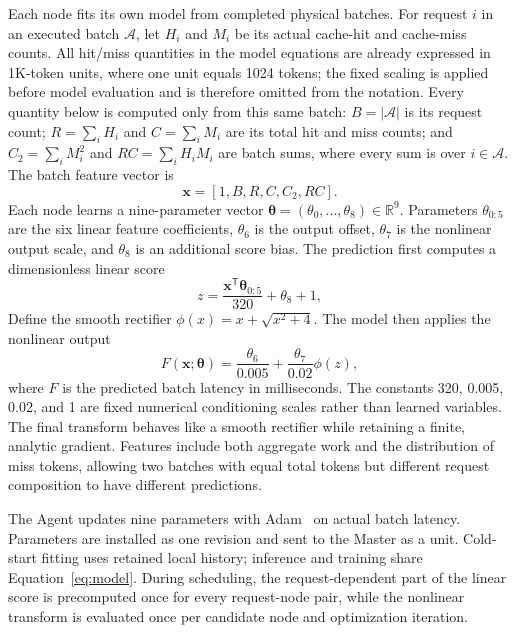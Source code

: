 \documentclass[10pt]{article}
\begin{document}
Each node fits its own model from completed physical batches. For request $i$
in an executed batch $\mathcal{A}$, let $H_i$ and $M_i$ be its actual cache-hit
and cache-miss counts. All hit/miss quantities in the model equations are
already expressed in 1K-token units, where one unit equals 1024 tokens; the
fixed scaling is applied before model evaluation and is therefore omitted
from the notation. Every quantity below is computed only from this same batch:
$B=|\mathcal{A}|$ is its request count; $R=\sum_iH_i$ and $C=\sum_iM_i$ are
its total hit and miss counts; and $C_2=\sum_iM_i^2$ and
$RC=\sum_iH_iM_i$ are batch sums, where every sum is over
$i\in\mathcal{A}$. The batch feature vector is
\begin{equation}
\mathbf{x}=
\left[1, B, R, C, C_2, RC\right].
\label{eq:features}
\end{equation}
Each node learns a nine-parameter vector
$\boldsymbol{\theta}=(\theta_0,\ldots,\theta_8)\in\mathbb{R}^9$.
Parameters $\theta_{0:5}$ are the six linear feature coefficients,
$\theta_6$ is the output offset, $\theta_7$ is the nonlinear output scale,
and $\theta_8$ is an additional score bias. The prediction first computes a
dimensionless linear score
\begin{equation}
z=\frac{\mathbf{x}^{\mathsf T}\boldsymbol{\theta}_{0:5}}{320}
  +\theta_8+1,
\end{equation}
Define the smooth rectifier $\phi(x)=x+\sqrt{x^2+4}$. The model then applies
the nonlinear output
\begin{equation}
F(\mathbf{x};\boldsymbol{\theta})=
\frac{\theta_6}{0.005}+
\frac{\theta_7}{0.02}\phi(z),
\label{eq:model}
\end{equation}
where $F$ is the predicted batch latency in milliseconds. The constants 320,
0.005, 0.02, and 1 are fixed numerical conditioning scales rather than learned
variables. The final transform behaves like a smooth rectifier while retaining
a finite, analytic gradient. Features include both aggregate work and the
distribution of miss tokens, allowing two batches with equal total tokens but
different request composition to have different predictions.

The Agent updates nine parameters with Adam~\cite{adam} on actual batch
latency. Parameters are installed as one revision and sent to the Master as a
unit. Cold-start fitting uses retained local history; inference and training
share Equation~\ref{eq:model}. During scheduling, the request-dependent part
of the linear score is precomputed once for every request-node pair, while the
nonlinear transform is evaluated once per candidate node and optimization
iteration.
\end{document}

